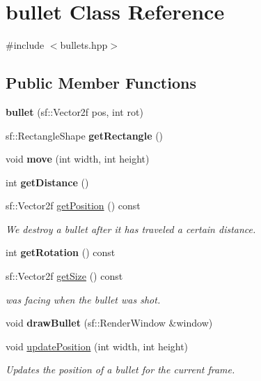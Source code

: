 \hypertarget{classbullet}{}\section{bullet Class Reference}
\label{classbullet}


{\ttfamily \#include $<$bullets.\+hpp$>$}

\subsection*{Public Member Functions}
\begin{DoxyCompactItemize}
\item 
\mbox{\label{classbullet_afc9330ddfb10e98d59cfb1359e1ea9b0}} 
{\bfseries bullet} (sf\+::\+Vector2f pos, int rot)
\item 
\mbox{\label{classbullet_a9f4034426b156baab6eee5cedd8aa646}} 
sf\+::\+Rectangle\+Shape {\bfseries get\+Rectangle} ()
\item 
\mbox{\label{classbullet_aba070f87d94abc6997189d73bd3f9a6a}} 
void {\bfseries move} (int width, int height)
\item 
\mbox{\label{classbullet_a7680994094c8622d4727bcb37fe9798f}} 
int {\bfseries get\+Distance} ()
\item 
\mbox{\label{classbullet_a3b21fb28f76972bdac3e170018e55826}} 
sf\+::\+Vector2f \hyperlink{classbullet_a3b21fb28f76972bdac3e170018e55826}{get\+Position} () const
\begin{DoxyCompactList}\small\item\em We destroy a bullet after it has traveled a certain distance. \end{DoxyCompactList}\item 
\mbox{\label{classbullet_ac573dfc221d187bc8e49639bc57c1a96}} 
int {\bfseries get\+Rotation} () const
\item 
sf\+::\+Vector2f \hyperlink{classbullet_a6e9ed12be7f5732751881ee72bbd55e5}{get\+Size} () const
\begin{DoxyCompactList}\small\item\em was facing when the bullet was shot. \end{DoxyCompactList}\item 
\mbox{\label{classbullet_a10fe267aa30e980783ba78eb38d0953d}} 
void {\bfseries draw\+Bullet} (sf\+::\+Render\+Window \&window)
\item 
\mbox{\label{classbullet_a4f130f5e2af986b1b39bcc399883e392}} 
void \hyperlink{classbullet_a4f130f5e2af986b1b39bcc399883e392}{update\+Position} (int width, int height)
\begin{DoxyCompactList}\small\item\em Updates the position of a bullet for the current frame. \end{DoxyCompactList}\end{DoxyCompactItemize}
